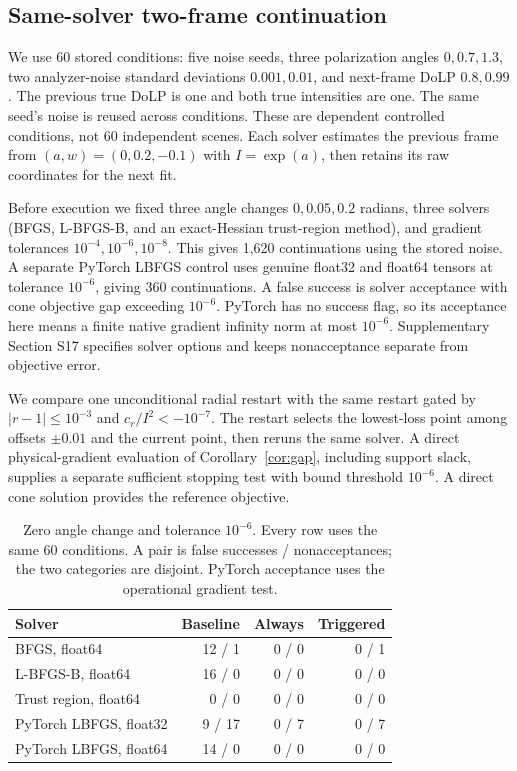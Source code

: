 \subsection{Same-solver two-frame continuation}
\label{sec:warmexperiment}
We use 60 stored conditions: five noise seeds, three polarization angles $0,0.7,1.3$, two analyzer-noise standard deviations $0.001,0.01$, and next-frame DoLP $0.8,0.99$. The previous true DoLP is one and both true intensities are one. The same seed's noise is reused across conditions. These are dependent controlled conditions, not 60 independent scenes. Each solver estimates the previous frame from $(a,w)=(0,0.2,-0.1)$ with $I=\exp(a)$, then retains its raw coordinates for the next fit.

Before execution we fixed three angle changes $0,0.05,0.2$ radians, three solvers (BFGS, L-BFGS-B, and an exact-Hessian trust-region method), and gradient tolerances $10^{-4},10^{-6},10^{-8}$. This gives 1,620 continuations using the stored noise. A separate PyTorch LBFGS control uses genuine float32 and float64 tensors at tolerance $10^{-6}$, giving 360 continuations. A false success is solver acceptance with cone objective gap exceeding $10^{-6}$. PyTorch has no success flag, so its acceptance here means a finite native gradient infinity norm at most $10^{-6}$. Supplementary Section S17 specifies solver options and keeps nonacceptance separate from objective error.

We compare one unconditional radial restart with the same restart gated by $|r-1|\leq10^{-3}$ and $c_r/I^2<-10^{-7}$. The restart selects the lowest-loss point among offsets $\pm0.01$ and the current point, then reruns the same solver. A direct physical-gradient evaluation of Corollary~\ref{cor:gap}, including support slack, supplies a separate sufficient stopping test with bound threshold $10^{-6}$. A direct cone solution provides the reference objective.

\begin{table}[!t]
\caption{Zero angle change and tolerance $10^{-6}$. Every row uses the same 60 conditions. A pair is false successes / nonacceptances; the two categories are disjoint. PyTorch acceptance uses the operational gradient test.}
\label{tab:warm}
\centering\small
\begin{tabular}{@{}lrrr@{}}\toprule
Solver & Baseline & Always & Triggered\\\midrule
BFGS, float64 & 12 / 1 & 0 / 0 & 0 / 1\\
L-BFGS-B, float64 & 16 / 0 & 0 / 0 & 0 / 0\\
Trust region, float64 & 0 / 0 & 0 / 0 & 0 / 0\\
PyTorch LBFGS, float32 & 9 / 17 & 0 / 7 & 0 / 7\\
PyTorch LBFGS, float64 & 14 / 0 & 0 / 0 & 0 / 0\\\bottomrule
\end{tabular}
\end{table}

